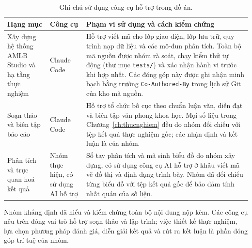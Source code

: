 \begin{table}[H]
  \centering
  \small
  \caption{Ghi chú sử dụng công cụ hỗ trợ trong đồ án.}
  \label{tab:ai-usage}
  \renewcommand{\arraystretch}{1.3}
  \begin{tabularx}{\linewidth}{@{}>{\raggedright\arraybackslash}p{3.1cm} >{\raggedright\arraybackslash}p{2.4cm} X@{}}
    \toprule
    \textbf{Hạng mục} & \textbf{Công cụ} & \textbf{Phạm vi sử dụng và cách kiểm chứng} \\
    \midrule
    Xây dựng hệ thống AMLB Studio và hạ tầng thực nghiệm &
    Claude Code &
    Hỗ trợ viết mã cho lớp giao diện, lớp lưu trữ, quy trình nạp dữ liệu và các
    mô-đun phân tích. Toàn bộ mã nguồn được nhóm rà soát, chạy kiểm thử tự động
    (thư mục \texttt{tests/}) và xác nhận hành vi trước khi hợp nhất. Các đóng góp
    này được ghi nhận minh bạch bằng trường \texttt{Co-Authored-By} trong lịch sử
    Git của kho mã nguồn. \\
    Soạn thảo và biên tập báo cáo &
    Claude Code &
    Hỗ trợ tổ chức bố cục theo chuẩn luận văn, diễn đạt và biên tập văn phong khoa
    học. Mọi số liệu trong Chương~\ref{ch:thucnghiem} đều do nhóm đối chiếu với tệp
    kết quả thực nghiệm gốc; các nhận định và kết luận là của nhóm. \\
    Phân tích và trực quan hoá kết quả &
    Nhóm thực hiện, có sử dụng AI hỗ trợ &
    Sổ tay phân tích và mã sinh biểu đồ do nhóm xây dựng, có sử dụng công cụ AI hỗ
    trợ ở khâu viết mã vẽ đồ thị và định dạng trình bày. Nhóm đã đối chiếu từng
    biểu đồ với tệp kết quả gốc để bảo đảm tính nhất quán của số liệu. \\
    \bottomrule
  \end{tabularx}
\end{table}

Nhóm khẳng định đã hiểu và kiểm chứng toàn bộ nội dung nộp kèm. Các công cụ nêu
trên đóng vai trò hỗ trợ soạn thảo và lập trình; việc thiết kế thực nghiệm, lựa
chọn phương pháp đánh giá, diễn giải kết quả và rút ra kết luận là phần đóng góp
trí tuệ của nhóm.
